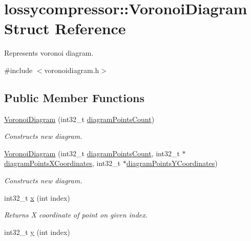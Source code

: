 \hypertarget{structlossycompressor_1_1_voronoi_diagram}{}\section{lossycompressor\+:\+:Voronoi\+Diagram Struct Reference}
\label{structlossycompressor_1_1_voronoi_diagram}


Represents voronoi diagram.  




{\ttfamily \#include $<$voronoidiagram.\+h$>$}

\subsection*{Public Member Functions}
\begin{DoxyCompactItemize}
\item 
\hyperlink{structlossycompressor_1_1_voronoi_diagram_a3af8697c5073ac38e36976cdd755464a}{Voronoi\+Diagram} (int32\+\_\+t \hyperlink{structlossycompressor_1_1_voronoi_diagram_a3b79c4a4ce91a937149b644304645e6d}{diagram\+Points\+Count})
\begin{DoxyCompactList}\small\item\em Constructs new diagram. \end{DoxyCompactList}\item 
\hyperlink{structlossycompressor_1_1_voronoi_diagram_a2547e0179a81e42487307588c1fd5da6}{Voronoi\+Diagram} (int32\+\_\+t \hyperlink{structlossycompressor_1_1_voronoi_diagram_a3b79c4a4ce91a937149b644304645e6d}{diagram\+Points\+Count}, int32\+\_\+t $\ast$\hyperlink{structlossycompressor_1_1_voronoi_diagram_a2bf9675b587d2114d0e9d5184d1ad48f}{diagram\+Points\+X\+Coordinates}, int32\+\_\+t $\ast$\hyperlink{structlossycompressor_1_1_voronoi_diagram_ac3efa950729f936c3281b82599d5f3fc}{diagram\+Points\+Y\+Coordinates})
\begin{DoxyCompactList}\small\item\em Constructs new diagram. \end{DoxyCompactList}\item 
int32\+\_\+t \hyperlink{structlossycompressor_1_1_voronoi_diagram_aa2f3aa173295f725d62f7c707693fc9d}{x} (int index)\hypertarget{structlossycompressor_1_1_voronoi_diagram_aa2f3aa173295f725d62f7c707693fc9d}{}\label{structlossycompressor_1_1_voronoi_diagram_aa2f3aa173295f725d62f7c707693fc9d}

\begin{DoxyCompactList}\small\item\em Returns X coordinate of point on given index. \end{DoxyCompactList}\item 
int32\+\_\+t \hyperlink{structlossycompressor_1_1_voronoi_diagram_ae05f1eb40ff45d63371cade022a23a15}{y} (int index)\hypertarget{structlossycompressor_1_1_voronoi_diagram_ae05f1eb40ff45d63371cade022a23a15}{}\label{structlossycompressor_1_1_voronoi_diagram_ae05f1eb40ff45d63371cade022a23a15}


\end{DoxyCompactItemize}
